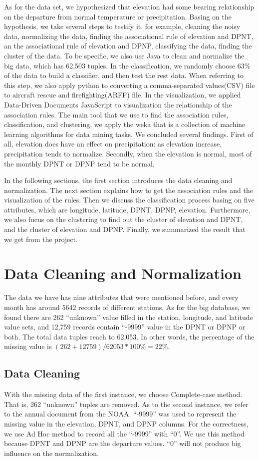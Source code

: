\documentclass[11pt]{article}
\begin{document}
As for the data set, we hypothesized that elevation had some bearing relationship on the departure from normal temperature or precipitation. Basing on the hypothesis, we take several steps to testify it, for example, cleaning the noisy data, normalizing the data, finding the associational rule of elevation and DPNT, an the associational rule of elevation and DPNP, classifying the data, finding the cluster of the data. To be specific, we also use Java to clean and normalize the big data, which has 62,503 tuples. In the classification, we randomly choose 63\% of the data to build a classifier, and then test the rest data. When referring to this step, we also apply python to converting a comma-separated values(CSV) file to aircraft rescue and firefighting(ARFF) file. In the visualization, we applied Data-Driven Documents JavaScript to visualization the relationship of the association rules. The main tool that we use to find the association rules, classification, and clustering, we apply the weka that is a collection of machine learning algorithms for data mining tasks\cite{hall2009weka}. We concluded several findings. First of all, elevation does have an effect on precipitation: as elevation increase, precipitation tends to normalize. Secondly, when the elevation is normal, most of the monthly DPNT or DPNP tend to be normal.

In the following sections, the first section introduces the data cleaning and normalization. The next section explains how to get the association rules and the visualization of the rules. Then we discuss the classification process basing on five attributes, which are longitude, latitude, DPNT, DPNP, elevation. Furthermore, we also fucus on the clustering to find out the cluster of elevation and DPNT, and the cluster of elevation and DPNP. Finally, we summarized the result that we get from the project.

\section{Data Cleaning and Normalization}
The data we have has nine attributes that were mentioned before, and every month has around 5642 records of different stations. As for the big database, we found there are 262 ``unknown'' value filled in the station, longitude, and latitude value sets, and 12,759 records contain ``-9999'' value in the DPNT or DPNP or both. The total data tuples reach to 62,053. In other words, the percentage of the missing value is $( 262 + 12759 ) / 62053 * 100\% = 22\% $.
\subsection{Data Cleaning}
With the missing data of the first instance, we choose Complete-case method\cite{han2006data}. That is, 262 ``unknown'' tuples are removed. As to the second instance, we refer to the annual document from the NOAA. ``-9999'' was used to represent the missing value in the elevation, DPNT, and DPNP columns. For the correctness, we use Ad Hoc method to record all the ``-9999'' with ``0''. We use this method because DPNT and DPNP are the departure values. ``0'' will not produce big influence on the normalization.
\end{document}
